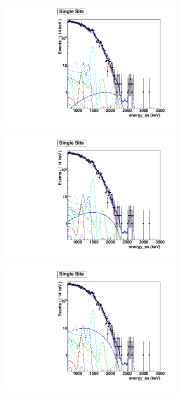 \documentclass[herrin-thesis.tex]{subfiles}
\begin{document}
\begin{figure}[htbp]
\centering
	\begin{subfigure}[c]{0.48\textwidth}
	\centering
	\includegraphics[width=\textwidth]{./plots/analysis_bb0nX1_90_fit_e_ss.pdf}
	\end{subfigure}\hfill%
	\begin{subfigure}[c]{0.48\textwidth}
	\centering
	\includegraphics[width=\textwidth]{./plots/analysis_bb0nX2_90_fit_e_ss.pdf}
	\end{subfigure}
	\begin{subfigure}[c]{0.48\textwidth}
	\centering
	\includegraphics[width=\textwidth]{./plots/analysis_bb0nX3_90_fit_e_ss.pdf}

\end{subfigure}
\end{figure}
\end{document}

